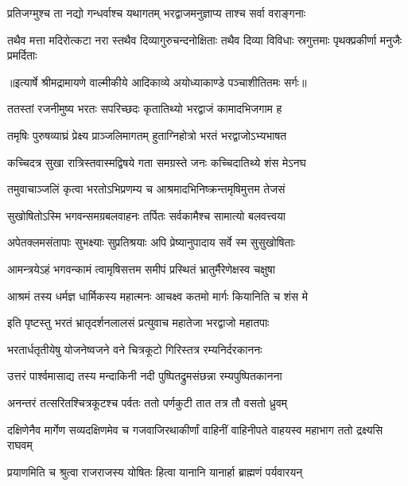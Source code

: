 \twolineshloka
{प्रतिजग्मुश्च ता नद्यो गन्धर्वाश्च यथागतम्}
{भरद्वाजमनुज्ञाप्य ताश्च सर्वा वराङ्गनाः} %

\fourlineindentedshloka
{तथैव मत्ता मदिरोत्कटा नरा}
{स्तथैव दिव्यागुरुचन्दनोक्षिताः}
{तथैव दिव्या विविधाः स्रगुत्तमाः}
{ पृथक्प्रकीर्णा मनुजैः प्रमर्दिताः} %


{॥इत्यार्षे श्रीमद्रामायणे वाल्मीकीये आदिकाव्ये अयोध्याकाण्डे पञ्चाशीतितमः सर्गः॥}


\twolineshloka
{ततस्तां रजनीमुष्य भरतः सपरिच्छदः}
{कृतातिथ्यो भरद्वाजं कामादभिजगाम ह} %

\twolineshloka
{तमृषिः पुरुषव्याघ्रं प्रेक्ष्य प्राञ्जलिमागतम्}
{हुताग्निहोत्रो भरतं भरद्वाजोऽभ्यभाषत} %

\twolineshloka
{कच्चिदत्र सुखा रात्रिस्तवास्मद्विषये गता}
{समग्रस्ते जनः कच्चिदातिथ्ये शंस मेऽनघ} %

\twolineshloka
{तमुवाचाञ्जलिं कृत्वा भरतोऽभिप्रणम्य च}
{आश्रमादभिनिष्क्रन्तमृषिमुत्तम तेजसं} %

\twolineshloka
{सुखोषितोऽस्मि भगवन्समग्रबलवाहनः}
{तर्पितः सर्वकामैश्च सामात्यो बलवत्त्वया} %

\twolineshloka
{अपेतक्लमसंतापाः सुभक्ष्याः सुप्रतिश्रयाः}
{अपि प्रेष्यानुपादाय सर्वे स्म सुसुखोषिताः} %

\twolineshloka
{आमन्त्रयेऽहं भगवन्कामं त्वामृषिसत्तम}
{समीपं प्रस्थितं भ्रातुर्मैरेणेक्षस्व चक्षुषा} %

\twolineshloka
{आश्रमं तस्य धर्मज्ञ धार्मिकस्य महात्मनः}
{आचक्ष्व कतमो मार्गः कियानिति च शंस मे} %

\twolineshloka
{इति पृष्टस्तु भरतं भ्रातृदर्शनलालसं}
{प्रत्युवाच महातेजा भरद्वाजो महातपाः} %

\twolineshloka
{भरतार्धतृतीयेषु योजनेष्वजने वने}
{चित्रकूटो गिरिस्तत्र रम्यनिर्दरकाननः} %

\twolineshloka
{उत्तरं पार्श्वमासाद्य तस्य मन्दाकिनी नदी}
{पुष्पितद्रुमसंछन्ना रम्यपुष्पितकानना} %

\twolineshloka
{अनन्तरं तत्सरितश्चित्रकूटश्च पर्वतः}
{ततो पर्णकुटी तात तत्र तौ वसतो ध्रुवम्} %

\threelineshloka
{दक्षिणेनैव मार्गेण सव्यदक्षिणमेव च}
{गजवाजिरथाकीर्णां वाहिनीं वाहिनीपते}
{वाहयस्व महाभाग ततो द्रक्ष्यसि राघवम्} %

\twolineshloka
{प्रयाणमिति च श्रुत्वा राजराजस्य योषितः}
{हित्वा यानानि यानार्हा ब्राह्मणं पर्यवारयन्} %

